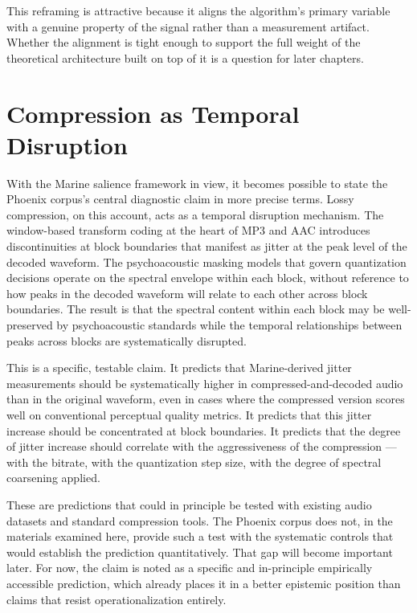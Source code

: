 This reframing is attractive because it aligns the algorithm's
primary variable with a genuine property of the signal rather than
a measurement artifact. Whether the alignment is tight enough to
support the full weight of the theoretical architecture built on
top of it is a question for later chapters.

\section{Compression as Temporal Disruption}
\label{sec:compression-temporal}

With the Marine salience framework in view, it becomes possible to
state the Phoenix corpus's central diagnostic claim in more precise
terms. Lossy compression, on this account, acts as a temporal
disruption mechanism. The window-based transform coding at the heart
of MP3 and AAC introduces discontinuities at block boundaries that
manifest as jitter at the peak level of the decoded waveform. The
psychoacoustic masking models that govern quantization decisions
operate on the spectral envelope within each block, without
reference to how peaks in the decoded waveform will relate to each
other across block boundaries. The result is that the spectral
content within each block may be well-preserved by psychoacoustic
standards while the temporal relationships between peaks across
blocks are systematically disrupted.

This is a specific, testable claim. It predicts that Marine-derived
jitter measurements should be systematically higher in
compressed-and-decoded audio than in the original waveform, even
in cases where the compressed version scores well on conventional
perceptual quality metrics. It predicts that this jitter increase
should be concentrated at block boundaries. It predicts that the
degree of jitter increase should correlate with the aggressiveness
of the compression --- with the bitrate, with the quantization
step size, with the degree of spectral coarsening applied.

These are predictions that could in principle be tested with
existing audio datasets and standard compression tools. The Phoenix
corpus does not, in the materials examined here, provide such a
test with the systematic controls that would establish the
prediction quantitatively. That gap will become important later.
For now, the claim is noted as a specific and in-principle
empirically accessible prediction, which already places it in
a better epistemic position than claims that resist operationalization
entirely.

